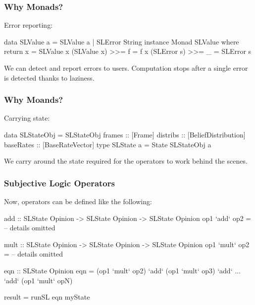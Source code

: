 \documentclass{beamer}
\begin{document}

\begin{frame}[fragile]
\frametitle{Why Monads?}

Error reporting:

\begin{code}
data SLValue a = SLValue a | SLError String
instance Monad SLValue where
  return x = SLValue x
  (SLValue x) >>= f = f x
  (SLError s) >>= _ = SLError s
\end{code}

We can detect and report errors to users. Computation stops after a single
error is detected thanks to laziness.

\end{frame}


\begin{frame}[fragile]
\frametitle{Why Moands?}

Carrying state:

\begin{code}
data SLStateObj = SLStateObj {
  frames :: [Frame]
  distribs :: [BeliefDistribution]
  baseRates :: [BaseRateVector]
}
type SLState a = State SLStateObj a
\end{code}

We carry around the state required for the operators to work behind the scenes.

\end{frame}


\begin{frame}[fragile]
\frametitle{Subjective Logic Operators}

Now, operators can be defined like the following:

\begin{code}
add :: SLState Opinion -> SLState Opinion -> SLState Opinion
op1 `add` op2 = -- details omitted

mult :: SLState Opinion -> SLState Opinion -> SLState Opinion
op1 `mult` op2 = -- details omitted

eqn :: SLState Opinion
eqn = (op1 `mult` op2) `add` (op1 `mult` op3)
                       `add`
                       ...
                       `add` (op1 `mult` opN)

result = runSL eqn myState
\end{code}

\end{frame}
\end{document}
